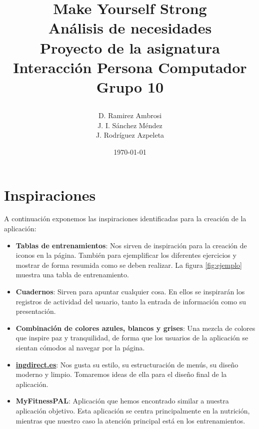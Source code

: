 \documentclass[a4paper]{article}
\date{}
\author{D. Ramirez Ambrosi \\ J. I. Sánchez Méndez \\ J. Rodríguez Azpeleta}
\title{\begin{center}
\textbf{\Huge{Make Yourself Strong}} \\ Análisis de necesidades  \\Proyecto de la asignatura Interacción Persona Computador \\ \Huge{Grupo 10}
\end{center}}
\date{\today}
\renewcommand\listfigurename{\centering LISTA DE FIGURAS}
\begin{document}
\maketitle

\thispagestyle{empty}%
\newpage
\tableofcontents%
\thispagestyle{empty}
\newpage





\setcounter{page}{1}%


\section{Inspiraciones}

A continuación exponemos las inspiraciones identificadas para la creación de la aplicación:

\begin{itemize}
	
	\item   \textbf{Tablas de entrenamientos}: Nos sirven de inspiración para la creación de iconos en la página. También para ejemplificar los diferentes ejercicios y mostrar de forma resumida como se deben realizar. La figura \ref{fig:ejemplo} muestra una tabla de entrenamiento.
	
	\item   \textbf{Cuadernos}: Sirven para apuntar cualquier cosa. En ellos se inspirarán los registros de actividad del usuario, tanto la entrada de información como su presentación.
	
	\item   \textbf{Combinación de colores azules, blancos y grises}: Una mezcla de colores que inspire paz y tranquilidad, de forma que los usuarios de la aplicación se sientan cómodos al navegar por la página.
	
	\item  \textbf{\url{ingdirect.es}}: Nos gusta su estilo, su estructuración de menús, su diseño moderno y limpio. Tomaremos ideas de ella para el diseño final de la aplicación.
	
	\item   \textbf{MyFitnessPAL}: Aplicación que hemos encontrado similar a nuestra aplicación objetivo. Esta aplicación se centra principalmente en la nutrición, mientras que nuestro caso la atención principal está en los entrenamientos.
\end{itemize}
\end{document}

